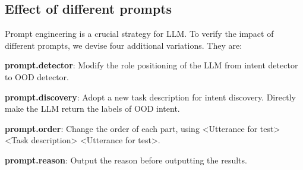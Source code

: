 \documentclass[10pt, a4paper]{article}
\begin{document}
\subsection{Effect of different prompts}
\label{sec:diff_prompt}
\begin{table}[t]
\caption{The performance of ChatGPT on various prompts.}
\label{tab:diff_prompt}
\end{table}

Prompt engineering is a crucial strategy for LLM. To verify the impact of different prompts, we devise four additional variations. They are: 

\textbf{prompt.detector}: Modify the role positioning of the LLM from intent detector to OOD detector.

\textbf{prompt.discovery}: Adopt a new task description for intent discovery. Directly make the LLM return the labels of OOD intent.

\textbf{prompt.order}: Change the order of each part, using <Utterance for test> <Task description> <Utterance for test>. 

\textbf{prompt.reason}: Output the reason before outputting the results. 
\end{document}

